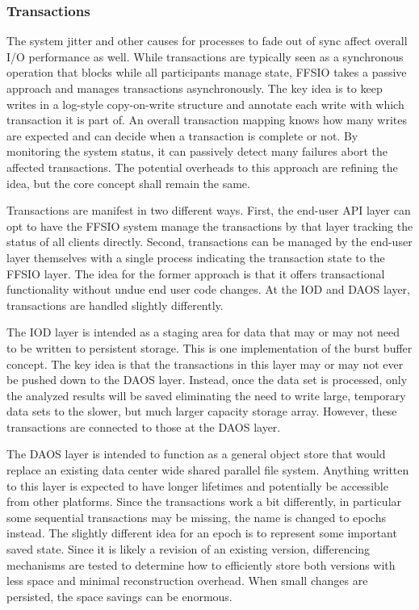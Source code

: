 \subsubsection{Transactions}
The system jitter and other causes for processes to fade out of sync affect
overall I/O performance as well. While transactions are typically seen as a
synchronous operation that blocks while all participants manage state, FFSIO
takes a passive approach and manages transactions asynchronously. The key idea
is to keep writes in a log-style copy-on-write structure and annotate each
write with which transaction it is part of. An overall transaction mapping
knows how many writes are expected and can decide when a transaction is
complete or not. By monitoring the system status, it can passively detect many
failures abort the affected transactions. The potential overheads to this
approach are refining the idea, but the core concept shall remain the same.

Transactions are manifest in two different ways. First, the end-user API layer
can opt to have the FFSIO system manage the transactions by that layer
tracking the status of all clients directly. Second, transactions can be
managed by the end-user layer themselves with a single process indicating the
transaction state to the FFSIO layer. The idea for the former approach is that
it offers transactional functionality without undue end user code changes. At
the IOD and DAOS layer, transactions are handled slightly differently.

The IOD layer is intended as a staging area for data that may or may not need
to be written to persistent storage. This is one implementation of the burst
buffer concept. The key idea is that the transactions in this layer may or may
not ever be pushed down to the DAOS layer. Instead, once the data set is
processed, only the analyzed results will be saved eliminating the need to
write large, temporary data sets to the slower, but much larger capacity
storage array. However, these transactions are connected to those at the DAOS
layer.

The DAOS layer is intended to function as a general object store that would
replace an existing data center wide shared parallel file system. Anything
written to this layer is expected to have longer lifetimes and potentially be
accessible from other platforms. Since the transactions work a bit differently,
in particular some sequential transactions may be missing, the name is changed
to epochs instead. The slightly different idea for an epoch is to represent
some important saved state. Since it is likely a revision of an existing
version, differencing mechanisms are tested to determine how to efficiently
store both versions with less space and minimal reconstruction overhead. When
small changes are persisted, the space savings can be enormous.

